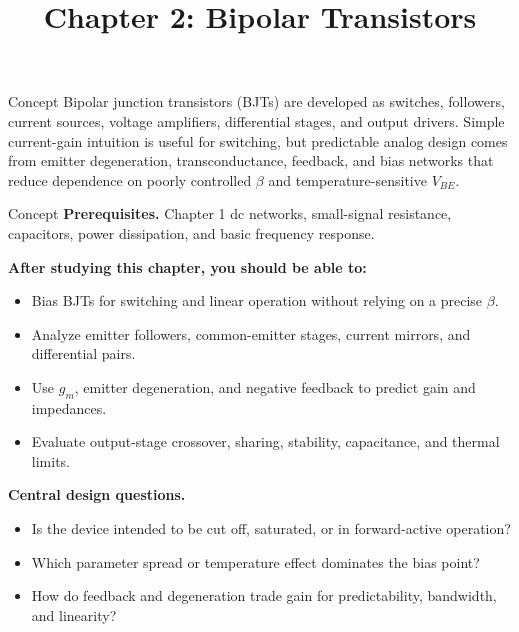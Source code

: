 \documentclass[10pt,letterpaper]{article}
\title{Chapter 2: Bipolar Transistors}
\author{}
\date{}
\begin{document}
\maketitle

\begin{CornellOverviewBox}{Concept}
Bipolar junction transistors (BJTs) are developed as switches, followers, current sources, voltage amplifiers, differential stages, and output drivers. Simple current-gain intuition is useful for switching, but predictable analog design comes from emitter degeneration, transconductance, feedback, and bias networks that reduce dependence on poorly controlled $\beta$ and temperature-sensitive $V_{BE}$.
\end{CornellOverviewBox}
\begin{CornellOverviewBox}{Concept}
\textbf{Prerequisites.} Chapter 1 dc networks, small-signal resistance, capacitors, power dissipation, and basic frequency response.

\textbf{After studying this chapter, you should be able to:}
\begin{itemize}
  \item Bias BJTs for switching and linear operation without relying on a precise $\beta$.
  \item Analyze emitter followers, common-emitter stages, current mirrors, and differential pairs.
  \item Use $g_m$, emitter degeneration, and negative feedback to predict gain and impedances.
  \item Evaluate output-stage crossover, sharing, stability, capacitance, and thermal limits.
\end{itemize}\textbf{Central design questions.}
\begin{itemize}
  \item Is the device intended to be cut off, saturated, or in forward-active operation?
  \item Which parameter spread or temperature effect dominates the bias point?
  \item How do feedback and degeneration trade gain for predictability, bandwidth, and linearity?
\end{itemize}\end{CornellOverviewBox}
\end{document}
